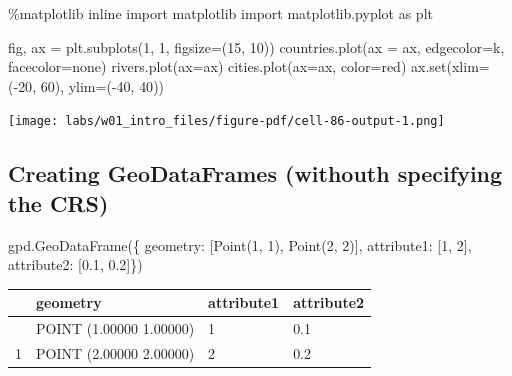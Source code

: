 \documentclass[
  letterpaper,
  DIV=11,
  numbers=noendperiod]{scrreprt}
\newenvironment{Shaded}{\begin{snugshade}}{\end{snugshade}}
\newcommand{\BuiltInTok}[1]{\textcolor[rgb]{0.00,0.23,0.31}{#1}}
\newcommand{\DecValTok}[1]{\textcolor[rgb]{0.68,0.00,0.00}{#1}}
\newcommand{\FloatTok}[1]{\textcolor[rgb]{0.68,0.00,0.00}{#1}}
\newcommand{\ImportTok}[1]{\textcolor[rgb]{0.00,0.46,0.62}{#1}}
\newcommand{\NormalTok}[1]{\textcolor[rgb]{0.00,0.23,0.31}{#1}}
\newcommand{\OperatorTok}[1]{\textcolor[rgb]{0.37,0.37,0.37}{#1}}
\newcommand{\StringTok}[1]{\textcolor[rgb]{0.13,0.47,0.30}{#1}}
\begin{document}
\begin{Shaded}
\begin{Highlighting}[]
\OperatorTok{\%}\NormalTok{matplotlib inline}
\ImportTok{import}\NormalTok{ matplotlib}
\ImportTok{import}\NormalTok{ matplotlib.pyplot }\ImportTok{as}\NormalTok{ plt}

\NormalTok{fig, ax }\OperatorTok{=}\NormalTok{ plt.subplots(}\DecValTok{1}\NormalTok{, }\DecValTok{1}\NormalTok{, figsize}\OperatorTok{=}\NormalTok{(}\DecValTok{15}\NormalTok{, }\DecValTok{10}\NormalTok{))}
\NormalTok{countries.plot(ax }\OperatorTok{=}\NormalTok{ ax, edgecolor}\OperatorTok{=}\StringTok{\textquotesingle{}k\textquotesingle{}}\NormalTok{, facecolor}\OperatorTok{=}\StringTok{\textquotesingle{}none\textquotesingle{}}\NormalTok{)}
\NormalTok{rivers.plot(ax}\OperatorTok{=}\NormalTok{ax)}
\NormalTok{cities.plot(ax}\OperatorTok{=}\NormalTok{ax, color}\OperatorTok{=}\StringTok{\textquotesingle{}red\textquotesingle{}}\NormalTok{)}
\NormalTok{ax.}\BuiltInTok{set}\NormalTok{(xlim}\OperatorTok{=}\NormalTok{(}\OperatorTok{{-}}\DecValTok{20}\NormalTok{, }\DecValTok{60}\NormalTok{), ylim}\OperatorTok{=}\NormalTok{(}\OperatorTok{{-}}\DecValTok{40}\NormalTok{, }\DecValTok{40}\NormalTok{))}
\end{Highlighting}
\end{Shaded}

\texttt{[image: labs/w01\_intro\_files/figure-pdf/cell-86-output-1.png]}

\subsection{Creating GeoDataFrames (withouth specifying the
CRS)}\label{creating-geodataframes-withouth-specifying-the-crs}

\begin{Shaded}
\begin{Highlighting}[]
\NormalTok{gpd.GeoDataFrame(\{}
    \StringTok{\textquotesingle{}geometry\textquotesingle{}}\NormalTok{: [Point(}\DecValTok{1}\NormalTok{, }\DecValTok{1}\NormalTok{), Point(}\DecValTok{2}\NormalTok{, }\DecValTok{2}\NormalTok{)],}
    \StringTok{\textquotesingle{}attribute1\textquotesingle{}}\NormalTok{: [}\DecValTok{1}\NormalTok{, }\DecValTok{2}\NormalTok{],}
    \StringTok{\textquotesingle{}attribute2\textquotesingle{}}\NormalTok{: [}\FloatTok{0.1}\NormalTok{, }\FloatTok{0.2}\NormalTok{]\})}
\end{Highlighting}
\end{Shaded}

\begin{longtable}[]{@{}llll@{}}
\toprule\noalign{}
& geometry & attribute1 & attribute2 \\
\midrule\noalign{}
\endhead
\bottomrule\noalign{}
\endlastfoot
0 & POINT (1.00000 1.00000) & 1 & 0.1 \\
1 & POINT (2.00000 2.00000) & 2 & 0.2 \\
\end{longtable}
\end{document}
